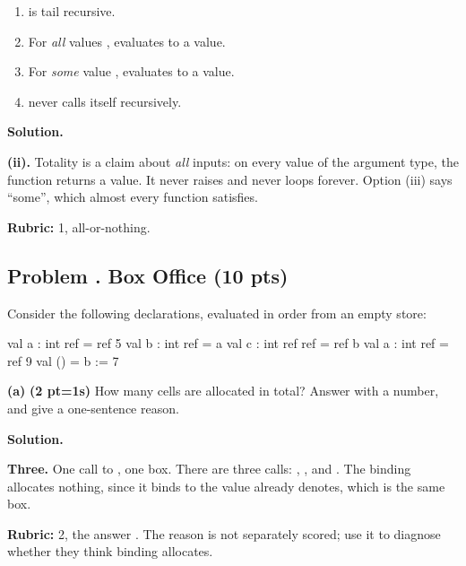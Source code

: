 \documentclass[crop=false]{standalone}
\newif\ifsol
\newenvironment{solution}
    {\par\color{solution_color}\begin{framed}\textbf{Solution.}\par}
    {\end{framed}}
\newcommand{\quizproblem}[3]{%
  \needspace{5\baselineskip}%
  \stepcounter{problem}%
  \ifsol
    \subsection*{Problem \arabic{problem}. #1 \hfill \timing{#2} \quad (#3 pts)}%
  \else
    \subsection*{Problem \arabic{problem}. #1 \hfill (#3 pts)}%
  \fi
}
\newcommand{\subpts}[1]{\textbf{(#1 pt\ifnum#1=1\else s\fi)}}
\newcommand{\answerspace}[1]{\ifsol\else\vspace{#1}\par\fi}
\begin{document}
\begin{enumerate}[label=(\roman*)]
  \item {} is tail recursive.
  \item For \emph{all} values ,  evaluates to a
    value.
  \item For \emph{some} value ,  evaluates to a
    value.
  \item {} never calls itself recursively.
\end{enumerate}

\answerspace{0.25cm}

\begin{solution}
\textbf{(ii).} Totality is a claim about \emph{all} inputs: on every
value of the argument type, the function returns a value. It never
raises and never loops forever. Option (iii) says ``some'', which almost
every function satisfies.

\textbf{Rubric:} 1, all-or-nothing.
\end{solution}


\quizproblem{Box Office}{9}{10}

Consider the following declarations, evaluated in order from an empty store:

\begin{codeblock}
  val a : int ref     = ref 5
  val b : int ref     = a
  val c : int ref ref = ref b
  val a : int ref     = ref 9
  val ()              = b := 7
\end{codeblock}

\textbf{(a)} \subpts{2} How many  cells are allocated in total?
Answer with a number, and give a one-sentence reason.

\answerspace{2.5cm}

\begin{solution}
\textbf{Three.} One call to , one box. There are three calls:
, , and . The binding
 allocates nothing, since it binds  to the value
 already denotes, which is the same box.

\textbf{Rubric:} 2, the answer . The reason is not separately
scored; use it to diagnose whether they think binding allocates.
\end{solution}
\end{document}

